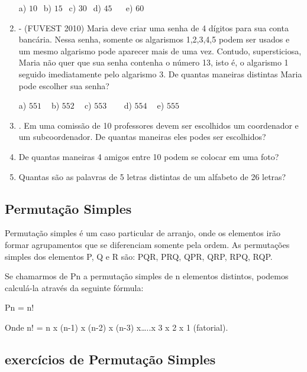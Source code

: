 \begin{multicols*}{2}
\begin{enumerate}
              a) $10 \ \ $ b) $15 \ \ $ c) $30 \ \ $ d) $45 \ \ \ \ \ \ $ e) $60 \ \ $

        \item - (FUVEST 2010) Maria deve criar uma senha de 4 dígitos para sua conta bancária.
              Nessa senha, somente os algarismos 1,2,3,4,5 podem ser usados e um mesmo algarismo pode
              aparecer mais de uma vez. Contudo, supersticiosa, Maria não quer que sua senha contenha o
              número 13, isto é, o algarismo 1 seguido imediatamente pelo algarismo 3. De quantas maneiras
              distintas Maria pode escolher sua senha?

              a) $551 \ \ \ \ $ b) $552 \ \ \ \ $ c) $553 \ \ \ \ \ \ \ \ $ d) $554 \ \ \ \ $ e) $555 \ \ $

        \item . Em uma comissão de 10 professores devem ser escolhidos um coordenador e um subcoordenador. De quantas maneiras eles podes ser escolhidos?

        \item De quantas maneiras 4 amigos entre 10 podem se colocar em uma foto?

        \item Quantas são as palavras de 5 letras distintas de um alfabeto de 26 letras?

    \end{enumerate}

    \subsection{Permutação Simples}

    Permutação simples é um caso particular de arranjo, onde os elementos irão formar agrupamentos que se diferenciam somente pela ordem. As permutações simples dos elementos P, Q e R são: PQR, PRQ, QPR, QRP, RPQ, RQP.

    Se chamarmos de Pn a permutação simples de n elementos distintos, podemos calculá-la através da seguinte fórmula:

    Pn = n!

    Onde n! = n x (n-1) x (n-2)  x (n-3) x…..x 3 x 2 x 1 (fatorial).

    \subsection{exercícios de Permutação Simples}

    \begin{enumerate}


\end{enumerate}
\end{multicols*}
